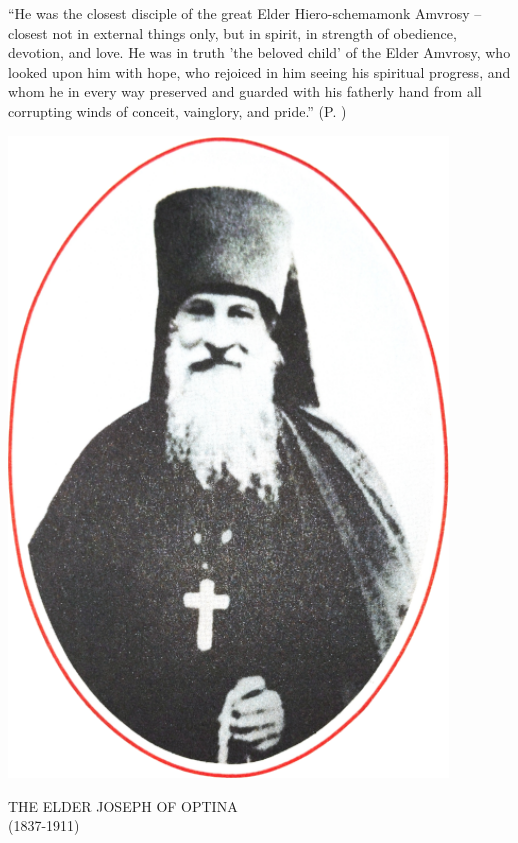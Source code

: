 \vspace*{\fill}
\minicross
\vspace{1cm}
\begin{adjustwidth}{1.25cm}{1.25cm}
``He was the closest disciple of the great Elder Hiero-schemamonk Amvrosy -- closest not in external things only, but in spirit, in strength of obedience, devotion, and love. He was in truth 'the beloved child' of the Elder Amvrosy, who looked upon him with hope, who rejoiced in him seeing his spiritual progress, and whom he in every way preserved and guarded with his fatherly hand from all corrupting winds of conceit, vainglory, and pride.'' (P. \pageref{intro-excerpt})
\end{adjustwidth}
\vspace{1cm}
\minicross
\vspace*{\fill}
\newpage
\vspace*{\fill}
\begin{center}
\includegraphics[height=17cm]{./Images/Elder_Joseph_Portrait.png}

\vspace*{\fill}
THE ELDER JOSEPH OF OPTINA\\
(1837-1911)
\end{center}
\vspace*{\fill}
